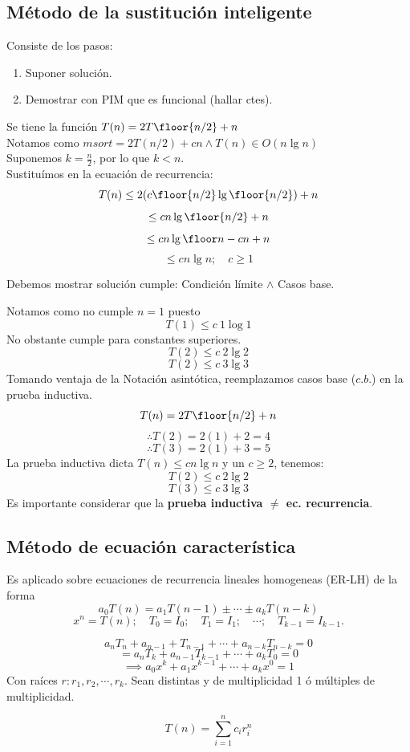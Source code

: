 \subsection{Método de la sustitución inteligente}
Consiste de los pasos:
\begin{enumerate}
	\item Suponer solución.
	\item Demostrar con PIM que es funcional (hallar ctes).
\end{enumerate}

\begin{example}

	Se tiene la función $T(n)=2T\floor{n/2}+n$\\
	Notamos como $msort=2T(n/2)+cn\land T(n)\in O(n\lg n)$\\
	Suponemos $k=\frac n2$, por lo que $k<n$.\\
	Sustituímos en la ecuación de recurrencia:
	$$ T(n)\le 2(c\floor{n/2}\lg \floor{n/2})+n $$
	$$ \le cn\lg \floor{n/2}+n$$
	$$ \le cn\lg \floor n-cn+n$$
	$$ \le cn\lg n;\quad c\ge1$$

	Debemos mostrar solución cumple: Condición límite $\land$ Casos base.

	Notamos como no cumple $n=1$ puesto
	$$ T(1)\le c~1\log 1 $$
	No obstante cumple para constantes superiores.
	$$ T(2)\le c~2\lg 2 $$$$
		T(2)\le c~3\lg 3 $$
	Tomando ventaja de la Notación asintótica, reemplazamos casos base ($c.b.$) en la prueba inductiva.
	$$ T(n)=2T\floor{n/2}+n $$$$
		\therefore T(2)=2(1)+2=4 $$$$
		\therefore T(3)=2(1)+3=5
	$$
	La prueba inductiva dicta $T(n)\le cn\lg n$ y un $c\ge2$, tenemos:
	$$
		T(2)\le c~2\lg 2    $$ $$
		T(3)\le c~3\lg 3
	$$
	Es importante considerar que la \textbf{prueba inductiva $\ne$ ec. recurrencia}.
\end{example}



\subsection{Método de ecuación característica}
Es aplicado sobre ecuaciones de recurrencia lineales homogeneas (ER-LH) de la forma
$$ a_0T(n)=a_1T(n-1)\pm\cdots\pm a_kT(n-k) $$
$$ x^n=T(n);\quad T_0=I_0;\quad T_1=I_1;\quad\cdots;\quad T_{k-1}=I_{k-1}.$$
\begin{definition}
	$$a_nT_n+a_{n-1}+T_{n-1}+\cdots+a_{n-k}T_{n-k}=0$$
	$$ =a_nT_k+a_{n-1}T_{k-1}+\cdots+a_kT_0=0 $$
	$$ \implies a_0x^k+a_1x^{k-1}+\cdots+a_kx^0=1 $$
	Con raíces $r:r_1,r_2,\cdots,r_k$.
	Sean distintas y de multiplicidad 1 ó múltiples de multiplicidad.
	\begin{theorem}[Mult. = 1]
		$$T(n)=\sum_{i=1}^n c_ir_i^n$$
	\end{theorem}
\end{definition}

